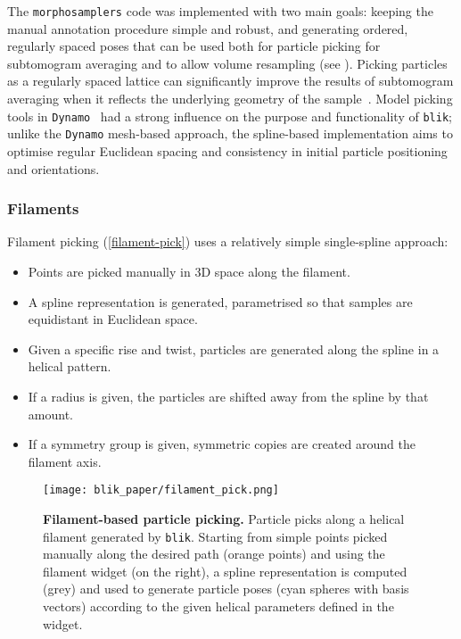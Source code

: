 The \texttt{morphosamplers} code was implemented with two main goals: keeping the manual annotation procedure simple and robust, and generating ordered, regularly spaced poses that can be used both for particle picking for subtomogram averaging and to allow volume resampling (see ). Picking particles as a regularly spaced lattice can significantly improve the results of subtomogram averaging when it reflects the underlying geometry of the sample~\cite{castano-diezDynamoCatalogueGeometrical2017,burtFlexibleFrameworkMultiparticle2021}. Model picking tools in \texttt{Dynamo}~\cite{castano-diezDynamoFlexibleUserfriendly2012} had a strong influence on the purpose and functionality of \texttt{blik}; unlike the \texttt{Dynamo} mesh-based approach, the spline-based implementation aims to optimise regular Euclidean spacing and consistency in initial particle positioning and orientations.

\subsubsection{Filaments}
Filament picking (\autoref{filament-pick}) uses a relatively simple single-spline approach:

\begin{itemize}[noitemsep]
    \item Points are picked manually in 3D space along the filament.
    \item A spline representation is generated, parametrised so that samples are equidistant in Euclidean space.
    \item Given a specific rise and twist, particles are generated along the spline in a helical pattern.
    \item If a radius is given, the particles are shifted away from the spline by that amount.
    \item If a symmetry group is given, symmetric copies are created around the filament axis.
\end{itemize}

\begin{figure}[!ht]
    \centering
    \texttt{[image: blik\_paper/filament\_pick.png]}
    \caption[Filament-based particle picking]{\textbf{Filament-based particle picking.} Particle picks along a helical filament generated by \texttt{blik}. Starting from simple points picked manually along the desired path (orange points) and using the filament widget (on the right), a spline representation is computed (grey) and used to generate particle poses (cyan spheres with basis vectors) according to the given helical parameters defined in the widget.}
    \label{filament-pick}
\end{figure}

